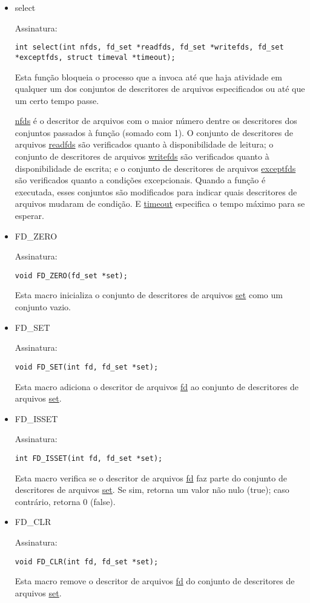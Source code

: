 \documentclass[a4paper,10pt]{article}
\begin{document}
\begin{itemize}
\item select

Assinatura:
\begin{lstlisting}
int select(int nfds, fd_set *readfds, fd_set *writefds, fd_set *exceptfds, struct timeval *timeout);
\end{lstlisting}
Esta função bloqueia o processo que a invoca até que haja atividade em qualquer um dos conjuntos de descritores de arquivos especificados ou até que um certo tempo passe.

\underline{nfds} é o descritor de arquivos com o maior número dentre os descritores dos conjuntos passados à função (somado com 1). O conjunto de descritores de arquivos \underline{readfds} são verificados quanto à disponibilidade de leitura; o conjunto de descritores de arquivos \underline{writefds} são verificados quanto à disponibilidade de escrita; e o conjunto de descritores de arquivos \underline{exceptfds} são verificados quanto a condições excepcionais. Quando a função é executada, esses conjuntos são modificados para indicar quais descritores de arquivos mudaram de condição. E \underline{timeout} especifica o tempo máximo para se esperar.

\item FD\_ZERO

Assinatura:
\begin{lstlisting}
void FD_ZERO(fd_set *set);
\end{lstlisting}
Esta macro inicializa o conjunto de descritores de arquivos \underline{set} como um conjunto vazio.

\item FD\_SET

Assinatura:
\begin{lstlisting}
void FD_SET(int fd, fd_set *set);
\end{lstlisting}
Esta macro adiciona o descritor de arquivos \underline{fd} ao conjunto de descritores de arquivos \underline{set}.

\item FD\_ISSET

Assinatura:
\begin{lstlisting}
int FD_ISSET(int fd, fd_set *set);
\end{lstlisting}
Esta macro verifica se o descritor de arquivos \underline{fd} faz parte do conjunto de descritores de arquivos \underline{set}. Se sim, retorna um valor não nulo (true); caso contrário, retorna 0 (false).

\item FD\_CLR

Assinatura:
\begin{lstlisting}
void FD_CLR(int fd, fd_set *set);
\end{lstlisting}
Esta macro remove o descritor de arquivos \underline{fd} do conjunto de descritores de arquivos \underline{set}.
\end{itemize}
\end{document}
